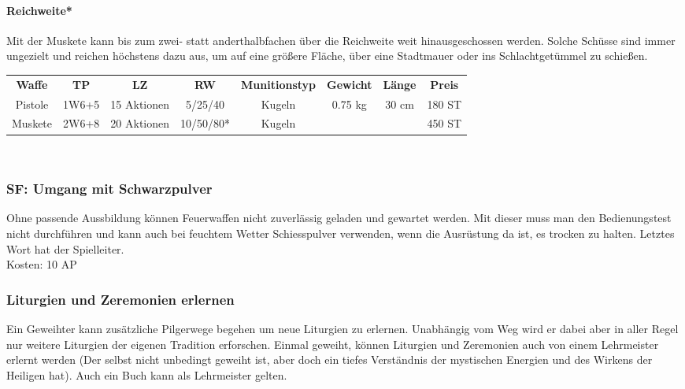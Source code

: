 \documentclass[9pt]{article}
\begin{document}
\begin{shaded}
\begin{multicols}{2}
			\paragraph{Reichweite*} Mit der Muskete kann bis zum zwei- statt anderthalbfachen über die Reichweite weit hinausgeschossen werden. Solche Schüsse sind immer ungezielt und reichen höchstens dazu aus, um auf eine größere Fläche, über eine Stadtmauer oder ins
			Schlachtgetümmel zu schießen.
		\end{multicols}
		\begin{tabular}{cccccccc}
			\hline \textbf{Waffe} & \textbf{TP} & \textbf{LZ} & \textbf{RW} & \textbf{Munitionstyp} & \textbf{Gewicht} & \textbf{Länge} & \textbf{Preis} \\ 
			Pistole & 1W6+5 & 15 Aktionen & 5/25/40 & Kugeln & 0.75 kg & 30 cm & 180 ST \\
			Muskete & 2W6+8 & 20 Aktionen & 10/50/80* & Kugeln & & & 450 ST \\
			\hline
		\end{tabular}
		\\
	\end{shaded}

	\begin{shaded*}
		\subsubsection{SF: Umgang mit Schwarzpulver}
		Ohne passende Aussbildung können Feuerwaffen nicht zuverlässig geladen und gewartet werden. Mit dieser muss man den Bedienungstest nicht durchführen und kann auch bei feuchtem Wetter Schiesspulver verwenden, wenn die Ausrüstung da ist, es trocken zu halten. Letztes Wort hat der Spielleiter.\\
		Kosten: 10 AP
	\end{shaded*}

\begin{shaded*}
	\subsubsection{Liturgien und Zeremonien erlernen}
	
	Ein Geweihter kann zusätzliche Pilgerwege begehen um neue Liturgien zu erlernen. Unabhängig vom Weg wird er dabei aber in aller Regel nur weitere Liturgien der eigenen Tradition erforschen. Einmal geweiht, können Liturgien und Zeremonien auch von einem Lehrmeister erlernt werden (Der selbst nicht unbedingt geweiht ist, aber doch ein tiefes Verständnis der mystischen Energien und des Wirkens der Heiligen hat). Auch ein Buch kann als Lehrmeister gelten.
\end{shaded*}
\end{document}
